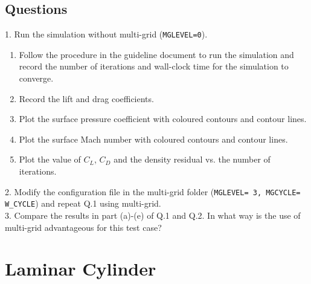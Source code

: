 \section{Questions}
1. Run the simulation without multi-grid (\texttt{MGLEVEL=0}).
\begin{enumerate}[label=(\alph*)]
    \item Follow the procedure in the guideline document to run the simulation and record the number of iterations and wall-clock time for the simulation to converge.
    \item Record the lift and drag coefficients.
    \item Plot the surface pressure coefficient with coloured contours and contour lines.
    \item Plot the surface Mach number with coloured contours and contour lines.
    \item Plot the value of $C_L$, $C_D$ and the density residual vs. the number of iterations.
\end{enumerate}
2. Modify the configuration file in the multi-grid folder (\texttt{MGLEVEL= 3, MGCYCLE= W\_CYCLE}) and repeat Q.1 using multi-grid.\\
3. Compare the results in part (a)-(e) of Q.1 and Q.2. In what way is the use of multi-grid advantageous for this test case?\\
\chapter{Laminar Cylinder}
\label{ch:Laminar Cylinder}
